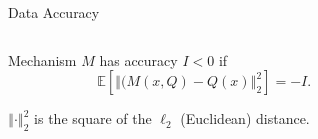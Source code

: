 \begin{frame}{Data Accuracy}
\begin{columns}[T] %
\begin{column}{.58\textwidth}
	\begin{wideitemize}
	    \item Mechanism $M$ has accuracy $I<0$ if
	     $$\mathbb{E}\left[\left\Vert(M(x,Q) - Q(x)\right\Vert^{2}_{2}\right] = -I.$$
	     \item $\left\Vert\cdot\right\Vert^{2}_{2}$ is the square of the $\ell_{2}$ (Euclidean) distance.
	\end{wideitemize}

\end{column}%
\hfill%
\begin{column}{.38\textwidth}
\end{column}%
\end{columns}
\end{frame}


